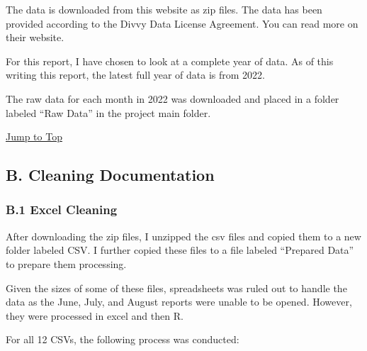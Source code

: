 \documentclass[
]{article}
\begin{document}
The data is downloaded from this website as zip files. The data has been
provided according to the Divvy Data License Agreement. You can read
more on their website.

For this report, I have chosen to look at a complete year of data. As of
this writing this report, the latest full year of data is from 2022.

The raw data for each month in 2022 was downloaded and placed in a
folder labeled ``Raw Data'' in the project main folder.

\protect\hyperlink{toc}{Jump to Top}

\hypertarget{b.-cleaning-documentation}{%
\subsection{B. Cleaning Documentation}\label{b.-cleaning-documentation}}

\hypertarget{b.1-excel-cleaning}{%
\subsubsection{B.1 Excel Cleaning}\label{b.1-excel-cleaning}}

After downloading the zip files, I unzipped the csv files and copied
them to a new folder labeled CSV. I further copied these files to a file
labeled ``Prepared Data'' to prepare them processing.

Given the sizes of some of these files, spreadsheets was ruled out to
handle the data as the June, July, and August reports were unable to be
opened. However, they were processed in excel and then R.

For all 12 CSVs, the following process was conducted:
\end{document}
